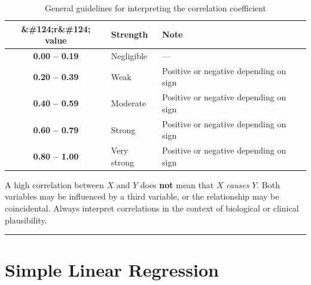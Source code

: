 \documentclass[
  12pt,
  letterpaper,
]{book}
\begin{document}
\begin{longtable}[t]{>{}cll}

\caption{\label{tbl-r-interpret}General guidelines for interpreting the
correlation coefficient}

\tabularnewline

\toprule
\&\#124;r\&\#124; value & Strength & Note\\
\midrule
\textcolor[HTML]{2c7bb6}{\textbf{0.00 – 0.19}} & Negligible & —\\
\textcolor[HTML]{2c7bb6}{\textbf{0.20 – 0.39}} & Weak & Positive or negative depending on sign\\
\textcolor[HTML]{2c7bb6}{\textbf{0.40 – 0.59}} & Moderate & Positive or negative depending on sign\\
\textcolor[HTML]{2c7bb6}{\textbf{0.60 – 0.79}} & Strong & Positive or negative depending on sign\\
\textcolor[HTML]{2c7bb6}{\textbf{0.80 – 1.00}} & Very strong & Positive or negative depending on sign\\
\bottomrule

\end{longtable}

\endgroup{}

\begin{tcolorbox}[enhanced jigsaw, arc=.35mm, bottomrule=.15mm, bottomtitle=1mm, breakable, colback=white, colbacktitle=quarto-callout-warning-color!10!white, colframe=quarto-callout-warning-color-frame, coltitle=black, left=2mm, leftrule=.75mm, opacityback=0, opacitybacktitle=0.6, rightrule=.15mm, title={⚠️ Correlation Is Not Causation}, titlerule=0mm, toprule=.15mm, toptitle=1mm]

A high correlation between \(X\) and \(Y\) does \textbf{not} mean that
\(X\) \emph{causes} \(Y\). Both variables may be influenced by a third
variable, or the relationship may be coincidental. Always interpret
correlations in the context of biological or clinical plausibility.

\end{tcolorbox}

\begin{center}\rule{0.5\linewidth}{0.5pt}\end{center}


\chapter{Simple Linear Regression}\label{simple-linear-regression}
\end{document}
